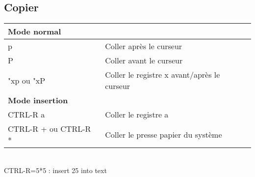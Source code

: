 \documentclass{article}
\begin{document}
\subsection{Copier}
\begin{tabular}{|p{3cm}| l| }\hline
\multicolumn{2}{|l|}{\textbf{Mode normal }} \\ \hline
p & Coller après le curseur \\ \hline
P & Coller avant le curseur \\ \hline
"xp ou "xP &  Coller le registre x avant/après le curseur \\ \hline
\multicolumn{2}{|l|}{\textbf{Mode insertion}} \\ \hline
CTRL-R a & Coller le registre a \\ \hline
CTRL-R + ou CTRL-R * & Coller le presse papier du système\\ \hline
\end{tabular}\\
CTRL-R=5*5    : insert 25 into text
\end{document}
